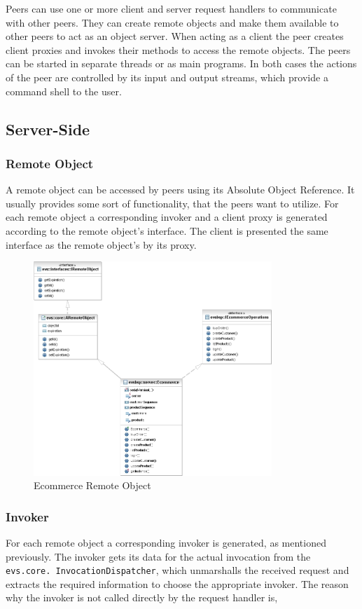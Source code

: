 Peers can use one or more client and server request handlers to communicate with other peers.
They can create remote objects and make them available to other peers to act as an object server.
When acting as a client the peer creates client proxies and invokes their methods to access the remote objects.
The peers can be started in separate threads or as main programs.
In both cases the actions of the peer are controlled by its input and output streams, which provide a command shell to the user.

\subsection{Server-Side}

\subsubsection{Remote Object}
A remote object can be accessed by peers using its Absolute Object Reference. It usually provides some sort of functionality, that the peers want to utilize. For each remote object a corresponding invoker and a client proxy is generated according to the remote object's interface. The client is presented the same interface as the remote object's by its proxy.

\begin{figure}[ht!]
	\centering\includegraphics[width=9cm]{uml/Ecommerce.jpg} 
	\caption{Ecommerce Remote Object}
	\label{fig:ecommerce}
\end{figure}


\subsubsection{Invoker}
For each remote object a corresponding invoker is generated, as mentioned previously. The invoker gets its data for the actual invocation from the \texttt{evs.core. InvocationDispatcher}, which unmarshalls the received request and extracts the required information to choose the appropriate invoker. The reason why the invoker is not called directly by the request handler is, 

